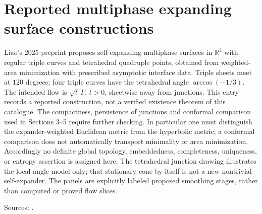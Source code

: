 \chapter{Reported multiphase expanding surface constructions}\label{sec:catalogue-multiphase-expander-report}
\begin{example}\label{ex:catalogue-multiphase-expander-report}
Liao's 2025 preprint proposes self-expanding multiphase surfaces in $\mathbb R^3$ with regular triple curves and tetrahedral quadruple points, obtained from weighted-area minimization with prescribed asymptotic interface data. Triple sheets meet at $120$ degrees; four triple curves have the tetrahedral angle $\arccos(-1/3)$. The intended flow is $\sqrt t\,\Gamma$, $t>0$, sheetwise away from junctions.
This entry records a reported construction, not a verified existence theorem of this catalogue. The compactness, persistence of junctions and conformal comparison used in Sections 3–5 require further checking. In particular one must distinguish the expander-weighted Euclidean metric from the hyperbolic metric; a conformal comparison does not automatically transport minimality or area minimization. Accordingly no definite global topology, embeddedness, completeness, uniqueness, or entropy assertion is assigned here. The tetrahedral junction drawing illustrates the local angle model only; that stationary cone by itself is not a new nontrivial self-expander. The panels are explicitly labeled proposed smoothing stages, rather than computed or proved flow slices.
\par Sources: \cite{CatLiao2025}.
\end{example}

